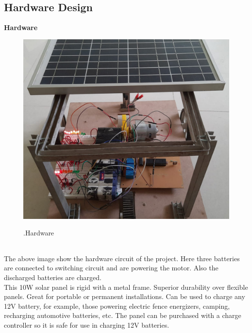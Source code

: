 \documentclass[a4paper,12pt]{article}
\begin{document}
\subsection{Hardware Design}
\textbf{Hardware}\\[1cm]
\begin{figure}[!h]
\centering
\includegraphics[scale=0.3]{hw1.jpeg}\\
\caption{.Hardware}
\end{figure}\\
The above image show the hardware circuit of the project. Here three batteries are connected to switching circuit and are powering the motor. Also the discharged batteries are charged.\\
This 10W solar panel is rigid with a metal frame. Superior durability over flexible panels. Great for portable or permanent installations. Can be used to charge any 12V battery, for example, those powering electric fence energizers, camping, recharging automotive batteries, etc. The panel can be purchased with a charge controller so it is safe for use in charging 12V batteries.
\end{document}
